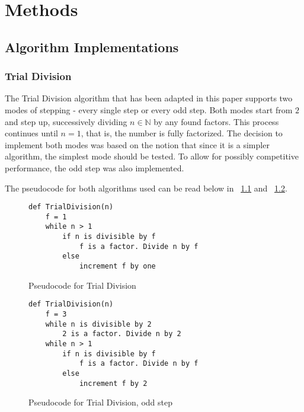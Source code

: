 \chapter{Methods}

\section{Algorithm Implementations}

\subsection{Trial Division}

The Trial Division algorithm that has been adapted in this paper supports two modes of stepping - every single step or every odd step. Both modes start from $2$ and step up, successively dividing $n\in\mathbb{N}$ by any found factors. This process continues until $n=1$, that is, the number is fully factorized. The decision to implement both modes was based on the notion that since it is a simpler algorithm, the simplest mode should be tested. To allow for possibly competitive performance, the odd step was also implemented.

The pseudocode for both algorithms used can be read below in ~\ref{fig:trialDivision1} and ~\ref{fig:trialDivision2}.

\begin{figure}[H]
    \centering
    \begin{minipage}{0.5\textwidth}
        \begin{verbatim}
def TrialDivision(n)
    f = 1
    while n > 1
        if n is divisible by f
            f is a factor. Divide n by f
        else
            increment f by one
        \end{verbatim}
    \end{minipage}
    \caption{Pseudocode for Trial Division}
    \label{fig:trialDivision1}
\end{figure}

\begin{figure}[H]
    \centering
    \begin{minipage}{0.5\textwidth}
        \begin{verbatim}
def TrialDivision(n)
    f = 3
    while n is divisible by 2
        2 is a factor. Divide n by 2
    while n > 1
        if n is divisible by f
            f is a factor. Divide n by f
        else
            increment f by 2
        \end{verbatim}
    \end{minipage}
    \caption{Pseudocode for Trial Division, odd step}
    \label{fig:trialDivision2}
\end{figure}

